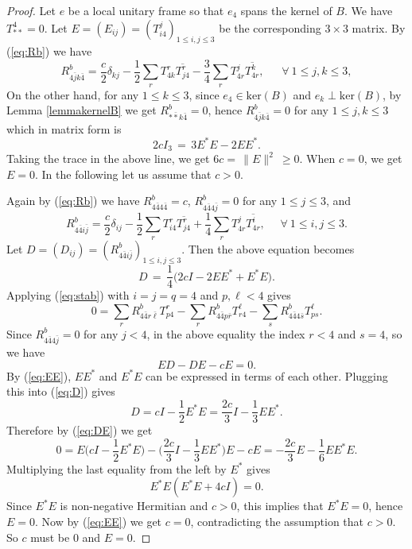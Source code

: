 \documentclass{amsart}
\begin{document}
\begin{proof}
Let $e$ be a local unitary frame so that $e_4$ spans the kernel of $B$. We have $T^4_{\ast \ast }=0$. Let $E=(E_{ij})=(T^j_{i4})_{1\leq i,j\leq 3}$ be the corresponding $3\times 3$ matrix.  By (\ref{eq:Rb}) we have
\begin{equation*}
 R^b_{4 \bar{j} k\bar{4}}= \frac{c}{2}\delta_{kj} - \frac{1}{2}\sum_r T^r_{4k} \overline{ T^r_{j4}} - \frac{3}{4} \sum_r T^j_{4r} \overline{ T^k_{4r}}, \ \ \ \ \ \ \ \forall \ 1\leq j,k\leq 3,
\end{equation*}
On the other hand, for any $1\leq k\leq 3$, since $e_4\in \mbox{ker}(B)$ and $e_k \perp \mbox{ker}(B)$, by Lemma \ref{lemmakernelB} we get $R^b_{\ast \bar{\ast} k\bar{4}}=0$, hence $R^b_{4 \bar{j} k\bar{4}}=0$ for any $1\leq j,k\leq 3$ which in matrix form is
\begin{equation} \label{eq:EE}
 2cI_3 \,= \,3 E^{\ast}E - 2E E^{\ast}.
\end{equation}
Taking the trace in the above line, we get $6c = \, \parallel\!E\!\parallel^2\ \geq 0$. When $c=0$, we get $E=0$. In the following let us assume that $c>0$.

Again by (\ref{eq:Rb}) we have $R^b_{4 \bar{4} 4\bar{4}}=c$, $R^b_{4 \bar{4} 4\bar{j}}=0$ for any $1\leq j\leq 3$, and
$$  R^b_{4 \bar{4} i\bar{j}}= \frac{c}{2}\delta_{ij} - \frac{1}{2}\sum_r T^r_{i4} \overline{T^r_{j4} } + \frac{1}{4}\sum_r T^j_{4r} \overline{T^i_{4r} }, \ \ \ \ \ \ \forall \ 1\leq i,j\leq 3. $$
Let $D=(D_{ij})=(R^b_{4\bar{4}i\bar{j}})_{1\leq i,j\leq 3}$. Then the above equation becomes
\begin{equation} \label{eq:D}
 D \,= \,\frac{1}{4}\big( 2cI - 2E E^{\ast}+  E^{\ast}E\big) .
\end{equation}
Applying (\ref{eq:stab}) with $i=j=q=4$ and $p,\ell<4$ gives
$$ 0 = \sum_r R^{b}_{4\bar{4}r\bar{\ell}}T^r_{p4} - \sum_r R^{b}_{4\bar{4}p\bar{r}}T^{\ell}_{r4} - \sum_s R^{b}_{4\bar{4}4\bar{s}}T^{\ell}_{ps}. $$
Since $R^b_{4\bar{4}4\bar{j}}=0$ for any $j<4$, in the above equality the index $r<4$ and $s=4$, so we have
\begin{equation} \label{eq:DE}
 ED - DE - cE  =0.
\end{equation}
By (\ref{eq:EE}),  $EE^{\ast}$ and $E^{\ast}E$ can be expressed in terms of each other. Plugging this into (\ref{eq:D}) gives
$$ D = cI - \frac{1}{2}E^{\ast }E = \frac{2c}{3}I - \frac{1}{3} EE^{\ast}. $$
Therefore by (\ref{eq:DE}) we get
$$ 0= E\big(cI - \frac{1}{2}E^{\ast }E\big) - \big( \frac{2c}{3}I - \frac{1}{3} EE^{\ast}\big) E - cE = -\frac{2c}{3}E - \frac{1}{6}EE^{\ast}E. $$
Multiplying the last equality from the left by $E^\ast$ gives
$$
E^\ast E(E^\ast E+4cI)=0.
$$
Since $E^\ast E$ is non-negative Hermitian and $c>0$, this implies that $E^\ast E=0$, hence $E=0$. Now by (\ref{eq:EE}) we get $c=0$, contradicting the assumption that $c>0$. So $c$ must be $0$ and $E=0$.




\end{proof}
\end{document}
